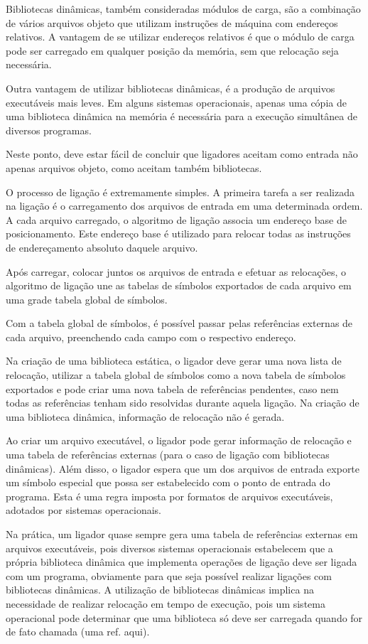 Bibliotecas dinâmicas, também consideradas módulos de carga, são a combinação de
vários arquivos objeto que utilizam instruções de máquina com endereços
relativos. A vantagem de se utilizar endereços relativos é que o módulo de carga
pode ser carregado em qualquer posição da memória, sem que relocação seja
necessária.

Outra vantagem de utilizar bibliotecas dinâmicas, é a produção de arquivos
executáveis mais leves. Em alguns sistemas operacionais, apenas uma cópia de uma
biblioteca dinâmica na memória é necessária para a execução simultânea de
diversos programas.

Neste ponto, deve estar fácil de concluir que ligadores aceitam como entrada não
apenas arquivos objeto, como aceitam também bibliotecas.

O processo de ligação é extremamente simples. A primeira tarefa a ser realizada
na ligação é o carregamento dos arquivos de entrada em uma determinada ordem. A
cada arquivo carregado, o algoritmo de ligação associa um endereço base de
posicionamento. Este endereço base é utilizado para relocar todas as instruções
de endereçamento absoluto daquele arquivo.

Após carregar, colocar juntos os arquivos de entrada e efetuar as relocações, o
algoritmo de ligação une as tabelas de símbolos exportados de cada arquivo em
uma grade tabela global de símbolos.

Com a tabela global de símbolos, é possível passar pelas referências externas de
cada arquivo, preenchendo cada campo com o respectivo endereço.

Na criação de uma biblioteca estática, o ligador deve gerar uma nova lista de
relocação, utilizar a tabela global de símbolos como a nova tabela de símbolos
exportados e pode criar uma nova tabela de referências pendentes, caso nem todas
as referências tenham sido resolvidas durante aquela ligação. Na criação de uma
biblioteca dinâmica, informação de relocação não é gerada.

Ao criar um arquivo executável, o ligador pode gerar informação de relocação e
uma tabela de referências externas (para o caso de ligação com bibliotecas
dinâmicas). Além disso, o ligador espera que um dos arquivos de entrada exporte
um símbolo especial que possa ser estabelecido com o ponto de entrada do
programa. Esta é uma regra imposta por formatos de arquivos executáveis,
adotados por sistemas operacionais.

Na prática, um ligador quase sempre gera uma tabela de referências externas em
arquivos executáveis, pois diversos sistemas operacionais estabelecem que a
própria biblioteca dinâmica que implementa operações de ligação deve ser ligada
com um programa, obviamente para que seja possível realizar ligações com
bibliotecas dinâmicas. A utilização de bibliotecas dinâmicas implica na
necessidade de realizar relocação em tempo de execução, pois um sistema
operacional pode determinar que uma biblioteca só deve ser carregada quando for
de fato chamada (uma ref. aqui).

